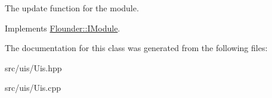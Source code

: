 The update function for the module. 



Implements \hyperlink{class_flounder_1_1_i_module_a1812bb03a6990e4698a10c043fa25fde}{Flounder\+::\+I\+Module}.



The documentation for this class was generated from the following files\+:\begin{DoxyCompactItemize}
\item 
src/uis/Uis.\+hpp\item 
src/uis/Uis.\+cpp\end{DoxyCompactItemize}
